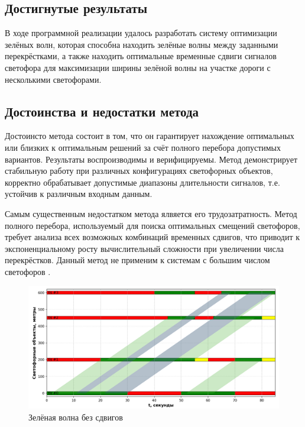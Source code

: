\documentclass[12pt]{article}
\begin{document}
\subsection{Достигнутые результаты}
В ходе программной реализации удалось разработать систему оптимизации зелёных волн, которая способна находить зелёные волны между заданными перекрёстками, а также находить оптимальные временные сдвиги сигналов светофора для максимизации ширины зелёной волны на участке дороги с несколькими светофорами.

\subsection{Достоинства и недостатки метода}

Достоинсто метода состоит в том, что он гарантирует нахождение оптимальных или близких к оптимальным решений за счёт полного перебора допустимых вариантов. Результаты воспроизводимы и верифицируемы. Метод демонстрирует стабильную работу при различных конфигурациях светофорных объектов,
корректно обрабатывает допустимые диапазоны длительности сигналов, т.е. устойчив к различным входным данным.
\newline

Самым существенным недостатком метода ялвяется его трудозатратность. Метод полного перебора, используемый для поиска оптимальных смещений светофоров, требует анализа всех возможных комбинаций временных сдвигов, что приводит к экспоненциальному росту вычислительный сложности при увеличении числа перекрёстков. Данный метод не применим к системам с большим числом светофоров .


\newpage

\begin{figure}[h!]
  \centering
  \includegraphics[width=1.1\textwidth]{images/No_offsets.png} 
  \caption{Зелёная волна без сдвигов} 
  \label{fig:diagram} 
\end{figure}
\end{document}
